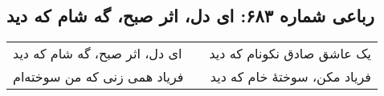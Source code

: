 \begin{center}
\section*{رباعی شماره ۶۸۳: ای دل، اثر صبح، گه شام که دید}
\label{sec:0683}
\begin{longtable}{l p{0.5cm} r}
ای دل، اثر صبح، گه شام که دید
&&
یک عاشق صادق نکونام که دید
\\
فریاد همی زنی که من سوخته‌ام
&&
فریاد مکن، سوختهٔ خام که دید
\\
\end{longtable}
\end{center}
